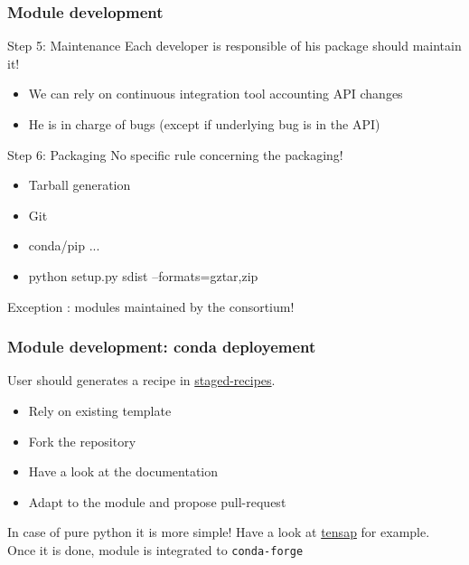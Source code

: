 \documentclass[8pt]{beamer}
\begin{document}
\begin{frame}
  \frametitle{Module development}
  \begin{block}{Step 5: Maintenance}
    Each developer is responsible of his package should maintain it!
    \begin{itemize}
    \item We can rely on continuous integration tool accounting API changes
    \item He is in charge of bugs (except if underlying bug is in the API)
    \end{itemize}
  \end{block}
  
  \begin{block}{Step 6: Packaging}
    No specific rule concerning the packaging!
    \begin{itemize}
    \item Tarball generation
    \item Git
    \item conda\slash pip ...
    \item \ttfamily python setup.py sdist --formats=gztar,zip
  
    \end{itemize}
    Exception : modules maintained by the consortium!
  \end{block}
\end{frame}

\begin{frame}
  \frametitle{Module development: conda deployement}
  \begin{block}{}
    User should generates a recipe in \href{https://github.com/conda-forge/staged-recipes}{staged-recipes}.
    \begin{itemize}
    \item Rely on existing template
    \item Fork the repository
    \item Have a look at the documentation
    \item Adapt to the module and propose pull-request
    \end{itemize}
    In case of pure python it is more simple! Have a look at \href{https://github.com/conda-forge/staged-recipes/pull/14533}{tensap} for example.\\
    Once it is done, module is integrated to \texttt{conda-forge}
  \end{block}
\end{frame}
\end{document}
